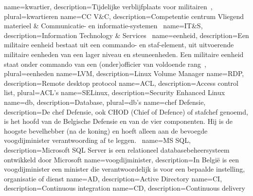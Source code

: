 \makeglossaries
{}
{
    name=kwartier,
    description={Tijdelijke verblijfplaats voor militairen~\autocite{Wikipedia2021}},
    plural=kwartieren
}
{
    name={CC V\&C},
    description={Competentie centrum Vliegend materieel \& Communicatie- en informatie-systemen~\autocite{Defensie2022a}}
}
{
    name=IT\&S,
    description={Information Technology \& Services~\autocite{Defensie2022a}}
}
{
    name=eenheid,
    description={Een militaire eenheid bestaat uit een commando- en staf-element, uit uitvoerende militaire eenheden van een lager niveau en steuneenheden. Een militaire eenheid staat onder commando van een (onder)officier van voldoende rang~\autocite{Wikipedia2021a}},
    plural=eenheden
}
{
    name=LVM,
    description={Linux Volume Manager}
}
{
    name=RDP,
    description={Remote desktop protocol}
}
{
    name=ACL,
    description={Access control list},
    plural={ACL's}
}
{
    name=SELinux,
    description={Security Enhanced Linux}
}
{
    name=db,
    description={Database},
    plural=db's
}
{
    name=chef Defensie,
    description={De chef Defensie, ook CHOD (Chief of Defence) of stafchef genoemd, is het hoofd van de Belgische Defensie en van de vier componenten. Hij is de hoogste bevelhebber (na de koning) en hoeft alleen aan de bevoegde \gls{voogdijminister} verantwoording af te leggen.~\autocite{Wikipedia2021b}}
}
{
    name={MS SQL},
    description={Microsoft SQL Server is een relationeel databasebeheersysteem ontwikkeld door Microsoft}
}
{
    name={voogdijminister},
    description={In België is een voogdijminister een minister die verantwoordelijk is voor een bepaalde instelling, organisatie of dienst}
}
{
    name={AD},
    description={Active Directory}
}
{
    name={CI},
    description={Continuous integration}
}
{
    name={CD},
    description={Continuous delivery}
}